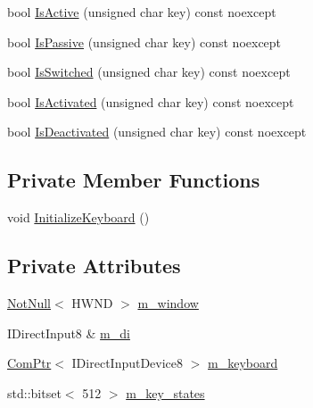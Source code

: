 \begin{DoxyCompactItemize}
\item 
bool \mbox{\hyperlink{classmage_1_1input_1_1_keyboard_a6a9cc65baf06080c7496417de89cd1e5}{Is\+Active}} (unsigned char key) const noexcept
\item 
bool \mbox{\hyperlink{classmage_1_1input_1_1_keyboard_a28806b2bc716e6849be259b7aa2956a7}{Is\+Passive}} (unsigned char key) const noexcept
\item 
bool \mbox{\hyperlink{classmage_1_1input_1_1_keyboard_a722ae998e69214f9126a4ee60397c208}{Is\+Switched}} (unsigned char key) const noexcept
\item 
bool \mbox{\hyperlink{classmage_1_1input_1_1_keyboard_a110c61213216a2286d9bd099cafa729f}{Is\+Activated}} (unsigned char key) const noexcept
\item 
bool \mbox{\hyperlink{classmage_1_1input_1_1_keyboard_a3c38020c099d0b1e8a3a083e146da7fa}{Is\+Deactivated}} (unsigned char key) const noexcept
\end{DoxyCompactItemize}
\subsection*{Private Member Functions}
\begin{DoxyCompactItemize}
\item 
void \mbox{\hyperlink{classmage_1_1input_1_1_keyboard_a9a764a44144ee846bc5fa8094fa591e2}{Initialize\+Keyboard}} ()
\end{DoxyCompactItemize}
\subsection*{Private Attributes}
\begin{DoxyCompactItemize}
\item 
\mbox{\hyperlink{namespacemage_a8769f9d670d6b585ea306cb1062af94b}{Not\+Null}}$<$ H\+W\+ND $>$ \mbox{\hyperlink{classmage_1_1input_1_1_keyboard_ac8074d4690146bf6523c236a7af50353}{m\+\_\+window}}
\item 
I\+Direct\+Input8 \& \mbox{\hyperlink{classmage_1_1input_1_1_keyboard_a3757173fa08e6744d374e0a5397de11c}{m\+\_\+di}}
\item 
\mbox{\hyperlink{namespacemage_ae74f374780900893caa5555d1031fd79}{Com\+Ptr}}$<$ I\+Direct\+Input\+Device8 $>$ \mbox{\hyperlink{classmage_1_1input_1_1_keyboard_ad6993f7c9fc9692708c1f928d0ea1e6b}{m\+\_\+keyboard}}
\item 
std\+::bitset$<$ 512 $>$ \mbox{\hyperlink{classmage_1_1input_1_1_keyboard_ad5b0ec6ca8ff1adbfed19c2382fa8a65}{m\+\_\+key\+\_\+states}}
\end{DoxyCompactItemize}



